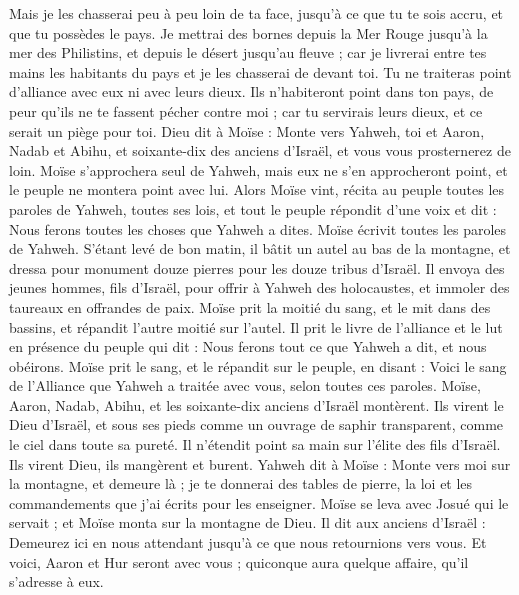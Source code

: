 \begin{multicols}{2}
Mais je les chasserai peu à peu loin de ta face, jusqu'à ce que tu te sois accru, et que tu possèdes le pays.
Je mettrai des bornes depuis la Mer Rouge jusqu'à la mer des Philistins, et depuis le désert jusqu'au fleuve ; car je livrerai entre tes mains les habitants du pays et je les chasserai de devant toi.
Tu ne traiteras point d'alliance avec eux ni avec leurs dieux.
Ils n'habiteront point dans ton pays, de peur qu'ils ne te fassent pécher contre moi ; car tu servirais leurs dieux, et ce serait un piège pour toi.
\VerseOne{}Dieu dit à Moïse : Monte vers Yahweh, toi et Aaron, Nadab et Abihu, et soixante-dix des anciens d'Israël, et vous vous prosternerez de loin.
Moïse s'approchera seul de Yahweh, mais eux ne s'en approcheront point, et le peuple ne montera point avec lui.
Alors Moïse vint, récita au peuple toutes les paroles de Yahweh, toutes ses lois, et tout le peuple répondit d'une voix et dit : Nous ferons toutes les choses que Yahweh a dites.
Moïse écrivit toutes les paroles de Yahweh. S'étant levé de bon matin, il bâtit un autel au bas de la montagne, et dressa pour monument douze pierres pour les douze tribus d'Israël.
Il envoya des jeunes hommes, fils d'Israël, pour offrir à Yahweh des holocaustes, et immoler des taureaux en offrandes de paix.
Moïse prit la moitié du sang, et le mit dans des bassins, et répandit l'autre moitié sur l'autel.
Il prit le livre de l'alliance et le lut en présence du peuple qui dit : Nous ferons tout ce que Yahweh a dit, et nous obéirons.
Moïse prit le sang, et le répandit sur le peuple, en disant : Voici le sang de l'Alliance que Yahweh a traitée avec vous, selon toutes ces paroles.
Moïse, Aaron, Nadab, Abihu, et les soixante-dix anciens d'Israël montèrent.
Ils virent le Dieu d'Israël, et sous ses pieds comme un ouvrage de saphir transparent, comme le ciel dans toute sa pureté.
Il n’étendit point sa main sur l’élite des fils d'Israël. Ils virent Dieu, ils mangèrent et burent.
Yahweh dit à Moïse : Monte vers moi sur la montagne, et demeure là ; je te donnerai des tables de pierre, la loi et les commandements que j'ai écrits pour les enseigner.
Moïse se leva avec Josué qui le servait ; et Moïse monta sur la montagne de Dieu.
Il dit aux anciens d'Israël : Demeurez ici en nous attendant jusqu'à ce que nous retournions vers vous. Et voici, Aaron et Hur seront avec vous ; quiconque aura quelque affaire, qu'il s'adresse à eux.

\end{multicols}
